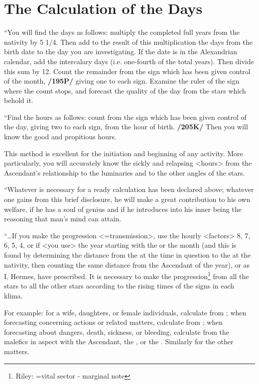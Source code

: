 \section{The Calculation of the Days}

“You will find the days as follows: multiply the completed full years from the nativity by 5 1/4.
Then add to the result of this multiplication the days from the birth date to the day you are investigating.
If the date is in the Alexandrian calendar, add the intercalary days (i.e. one-fourth of the total years). Then divide this sum by 12. Count the remainder from the sign which has been given control of the month, \textbf{/195P/} giving one to each sign. Examine the ruler of the sign where the count stops, and forecast the quality of the day from the stars which behold it.

“Find the hours as follows: count from the sign which has been given control of the day, giving two to each sign, from the hour of birth. \textbf{/205K/} Then you will know the good and propitious hours. 

This method is excellent for the initiation and beginning of any activity. More particularly, you will accurately
know the sickly and relapsing <hours> from the Ascendant’s relationship to the luminaries and to the other angles of the stars.

“Whatever is necessary for a ready calculation has been declared above; whatever one gains from this brief disclosure, he will make a great contribution to his own welfare, if he has a soul of genius and if he introduces into his inner being the reasoning that man’s mind can attain.

“…If you make the progression <=transmission>, use the hourly <factors> 8, 7, 6, 5, 4, or if <you
use> the year starting with the \Sun\xspace or the month (and this is found by determining the distance from the \Sun\xspace at the time in question to the \Moon\xspace at the nativity, then counting the same distance from the Ascendant of the year), or as I, Hermes, have prescribed. It is necessary to make the progression\footnote{Riley: =vital sector - marginal note} from all the stars to all the other stars according to the rising times of the signs in each klima. 

For example: for a wife, daughters, or female individuals, calculate from \Venus; when forecasting concerning actions or related matters, calculate from \Mercury; when forecasting about dangers, death, sickness, or bleeding, calculate from the malefics in aspect with the Ascendant, the \Sun, or the \Moon. Similarly for the other matters. 

